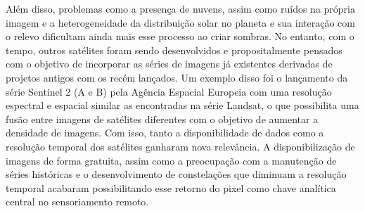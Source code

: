 \documentclass[twocolumn]{article}
\begin{document}
Além disso, problemas como a presença de nuvens, assim como ruídos na própria imagem e a heterogeneidade da distribuição solar no planeta e sua interação com o relevo dificultam ainda mais esse processo ao criar sombras. No entanto, com o tempo, outros satélites foram sendo desenvolvidos e propositalmente pensados com o objetivo de incorporar as séries de imagens já existentes derivadas de projetos antigos com os recém lançados. Um exemplo disso foi o lançamento da série Sentinel 2 (A e B) pela Agência Espacial Europeia com uma resolução espectral e espacial similar as encontradas na série Landsat, o que possibilita uma fusão entre imagens de satélites diferentes com o objetivo de aumentar a densidade de imagens. Com isso, tanto a disponibilidade de dados como a resolução temporal dos satélites ganharam nova relevância. A disponibilização de imagens de forma gratuita, assim como a preocupação com a manutenção de séries históricas e o desenvolvimento de constelações que diminuam a resolução temporal acabaram possibilitando esse retorno do pixel como chave analítica central no sensoriamento remoto.
\par
\end{document}
